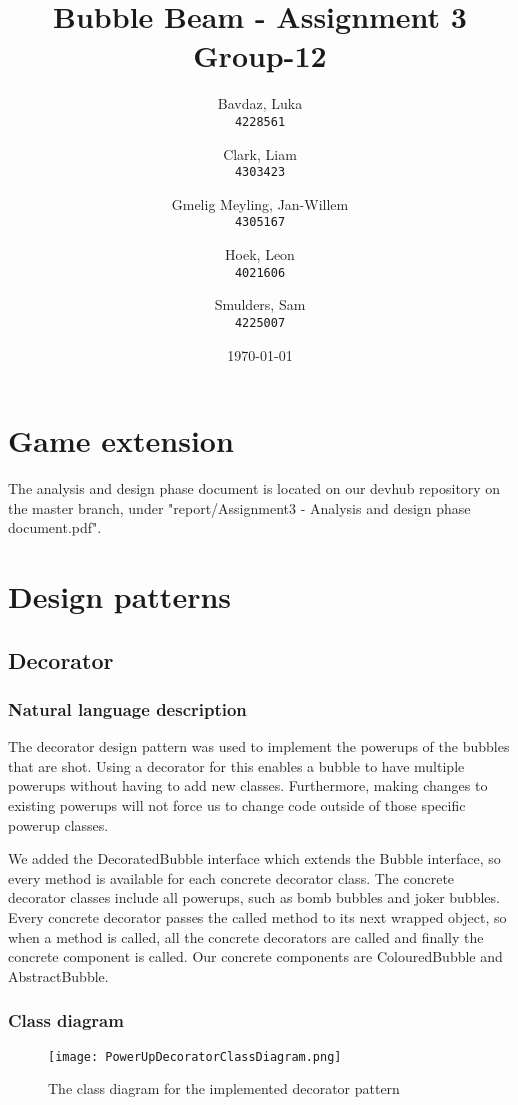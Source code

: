 \documentclass[a4paper]{article}
\title{Bubble Beam - Assignment 3\\Group-12}
\author{
    Bavdaz, Luka\\
    \texttt{4228561}
    \and
    Clark, Liam\\
    \texttt{4303423}
    \and
    Gmelig Meyling, Jan-Willem\\
    \texttt{4305167}
    \and
    Hoek, Leon\\
    \texttt{4021606}
    \and
    Smulders, Sam\\
    \texttt{4225007}
}
\date{\today}
\begin{document}
\maketitle

\section{Game extension}
The analysis and design phase document is located on our devhub repository on the master branch, under "report/Assignment3 - Analysis and design phase document.pdf".
\section{Design patterns}

\subsection{Decorator}

\subsubsection{Natural language description}
The decorator design pattern was used to implement the powerups of the bubbles that are shot. Using a decorator for this enables a bubble to have multiple powerups without having to add new classes. Furthermore, making changes to existing powerups will not force us to change code outside of those specific powerup classes.

We added the DecoratedBubble interface which extends the Bubble interface, so every method is available for each concrete decorator class. The concrete decorator classes include all powerups, such as bomb bubbles and joker bubbles. Every concrete decorator passes the called method to its next wrapped object, so when a method is called, all the concrete decorators are called and finally the concrete component is called. Our concrete components are ColouredBubble and AbstractBubble.

\subsubsection{Class diagram}
\begin{figure}[H]
    \texttt{[image: PowerUpDecoratorClassDiagram.png]}
    \caption{\label{fig:PowerUpDecoratorClassDiagram} The class diagram for the implemented decorator pattern}
\end{figure}
\end{document}
